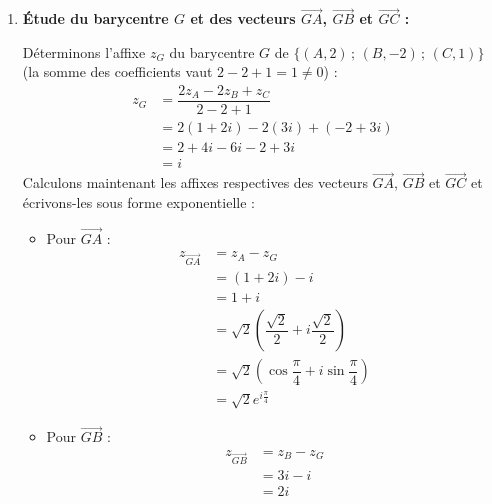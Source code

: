 \documentclass[12pt,a4paper]{article}
\begin{document}
\begin{enumerate}
\begin{enumerate}
        \item \textbf{Ensemble des solutions de $(\mathcal{E})$ :}
        
        L'équation $(\mathcal{E})$ est une équation polynomiale de degré $3$ dans $\mathbb{C}$ ; elle admet donc au plus $3$ solutions distinctes. Or, nous avons exhibé trois solutions deux à deux distinctes : $3i$, $1 + 2i$ et $-2 + 3i$.
        
        L'ensemble des solutions de $(\mathcal{E})$ dans $\mathbb{C}$ est donc :
        $$
        \mathcal{S} = \left\{ 3i \,;\, 1 + 2i \,;\, -2 + 3i \right\}
        $$
    \end{enumerate}

    \item \textbf{Étude du barycentre $G$ et des vecteurs $\overrightarrow{GA}$, $\overrightarrow{GB}$ et $\overrightarrow{GC}$ :}
    
    Déterminons l'affixe $z_G$ du barycentre $G$ de $\{(A, 2) \,;\, (B, -2) \,;\, (C, 1)\}$ (la somme des coefficients vaut $2 - 2 + 1 = 1 \neq 0$) :
    $$
    \begin{aligned}
        z_G &= \dfrac{2z_A - 2z_B + z_C}{2 - 2 + 1} \\
        &= 2(1 + 2i) - 2(3i) + (-2 + 3i) \\
        &= 2 + 4i - 6i - 2 + 3i \\
        &= i
    \end{aligned}
    $$
    Calculons maintenant les affixes respectives des vecteurs $\overrightarrow{GA}$, $\overrightarrow{GB}$ et $\overrightarrow{GC}$ et écrivons-les sous forme exponentielle :
    \begin{itemize}
        \item Pour $\overrightarrow{GA}$ :
        $$
        \begin{aligned}
            z_{\overrightarrow{GA}} &= z_A - z_G \\
            &= (1 + 2i) - i \\
            &= 1 + i \\
            &= \sqrt{2}\left( \dfrac{\sqrt{2}}{2} + i\dfrac{\sqrt{2}}{2} \right) \\
            &= \sqrt{2}\left( \cos\dfrac{\pi}{4} + i\sin\dfrac{\pi}{4} \right) \\
            &= \sqrt{2}e^{i\frac{\pi}{4}}
        \end{aligned}
        $$

        \item Pour $\overrightarrow{GB}$ :
        $$
        \begin{aligned}
            z_{\overrightarrow{GB}} &= z_B - z_G \\
            &= 3i - i \\
            &= 2i
        \end{aligned}
        $$


\end{itemize}
\end{enumerate}
\end{document}
